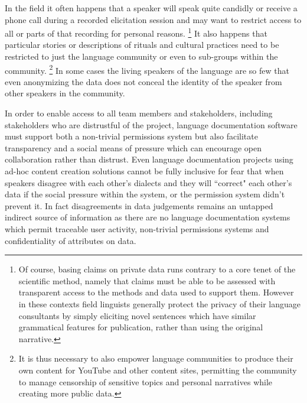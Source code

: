 \documentclass[11pt]{article}
\begin{document}
In the field it often happens that a speaker
will speak quite candidly or receive a phone call  during a recorded elicitation session and may want to
restrict access to all or parts of that recording for personal reasons.%
\footnote{Of course, basing claims on private data runs contrary to a core tenet of the
scientific method, namely that claims must be able to be assessed with
transparent access to the methods and data used to support them. 
However in these contexts field linguists generally protect the privacy of their language consultants by simply eliciting novel sentences which have similar grammatical features for publication, rather than using the original narrative.}
It also
happens that particular stories or descriptions of rituals and cultural
practices need to be restricted to just the language community or even to
sub-groups within the community.%
\footnote{It is thus necessary to also empower language communities to produce their own content for YouTube and other content sites, permitting the community to manage censorship of  sensitive topics and personal narratives while creating more public data.}
In some cases the living speakers of the language are so few that even anonymizing the data does not conceal the identity of the speaker from other speakers in the community. 



In order to enable access to all team members and stakeholders, including stakeholders who are distrustful of the project, language documentation software must support both a non-trivial permissions system but also facilitate transparency and a social means of pressure which can encourage open collaboration rather than distrust. 
Even language documentation projects using ad-hoc content creation solutions cannot be fully inclusive for fear that when speakers disagree with each other's dialects and they will ``correct"  each other's data if the social pressure within the system, or the permission system didn't prevent it. 
In fact disagreements in data judgements remains an untapped  indirect source of information as there are no language documentation systems which permit  traceable user activity, non-trivial permissions systems and confidentiality of attributes on data.%
\end{document}
